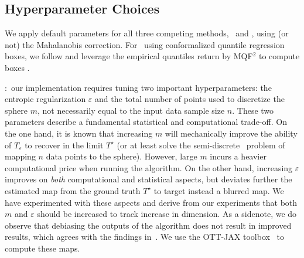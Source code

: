 \subsection{Hyperparameter Choices}
We apply default parameters for all three competing methods, \MCP\ and \MergeCP, using (or not) the Mahalanobis correction. For \MCP\ using conformalized quantile regression boxes, we follow \citep{dheur2025multioutputconformalregressionunified} and leverage the empirical quantiles return by MQF$^2$ to compute boxes \citep{zhou2024conformalized}.

\OTCP:\ our implementation requires tuning two important hyperparameters: the entropic regularization $\varepsilon$ and the total number of points used to discretize the sphere $m$, not necessarily equal to the input data sample size $n$. These two parameters describe a fundamental statistical and computational trade-off. On the one hand, it is known that increasing $m$ will mechanically improve the ability of $T_\varepsilon$ to recover in the limit $T^\star$ (or at least solve the semi-discrete~\citep{PeyCut19} problem of mapping $n$ data points to the sphere). However, large $m$ incurs a heavier computational price when running the \citeauthor{Sinkhorn64} algorithm. On the other hand, increasing $\varepsilon$ improves on \textit{both} computational and statistical aspects, but deviates further the estimated map from the ground truth $T^\star$ to target instead a blurred map. We have experimented with these aspects and derive from our experiments that both $m$ and $\varepsilon$ should be increased to track increase in dimension. As a sidenote, we do observe that debiasing the outputs of the \citeauthor{Sinkhorn64} algorithm does not result in improved results, which agrees with the findings in~\citep{pooladian2022debiaser}. We use the OTT-JAX toolbox~\citep{cuturi2022optimaltransporttoolsott} to compute these maps.

